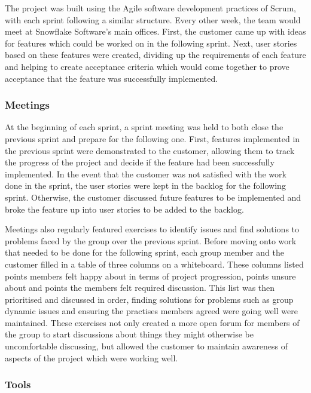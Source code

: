 \documentclass[a4paper, 12pt, twoside]{article}
\begin{document}
The project was built using the Agile software development practices of Scrum, with each sprint following a similar structure. Every other week, the team would meet at Snowflake Software's main offices. First, the customer came up with ideas for features which could be worked on in the following sprint. Next, user stories based on these features were created, dividing up the requirements of each feature and helping to create acceptance criteria which would come together to prove acceptance that the feature was successfully implemented.

\subsubsection{Meetings} 

At the beginning of each sprint, a sprint meeting was held to both close the previous sprint and prepare for the following one. First, features implemented in the previous sprint were demonstrated to the customer, allowing them to track the progress of the project and decide if the feature had been successfully implemented. In the event that the customer was not satisfied with the work done in the sprint, the user stories were kept in the backlog for the following sprint. Otherwise, the customer discussed future features to be implemented and broke the feature up into user stories to be added to the backlog.

Meetings also regularly featured exercises to identify issues and find solutions to problems faced by the group over the previous sprint. Before moving onto work that needed to be done for the following sprint, each group member and the customer filled in a table of three columns on a whiteboard. These columns listed points members felt happy about in terms of project progression, points unsure about and points the members felt required discussion. This list was then prioritised and discussed in order, finding solutions for problems such as group dynamic issues and ensuring the practises members agreed were going well were maintained. These exercises not only created a more open forum for members of the group to start discussions about things they might otherwise be uncomfortable discussing, but allowed the customer to maintain awareness of aspects of the project which were working well.

\subsubsection{Tools}
\end{document}
